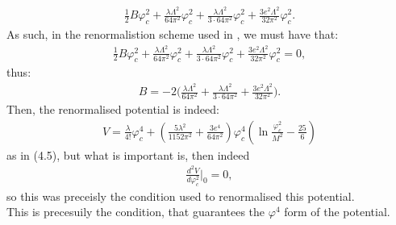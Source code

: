 \begin{align}
\frac{1}{2}B\varphi_c^2 + 
\frac{\lambda\Lambda^2}{64\pi^2}\varphi_c^2+ 
\frac{\lambda\Lambda^2}{3\cdot 64\pi^2}\varphi_c^2+
\frac{3e^2\Lambda^2}{32\pi^2}\varphi_c^2. 
\end{align}
As such, in the renormalistion scheme used in \cite{Coleman1973}, we must have that:
\begin{align}
\frac{1}{2}B\varphi_c^2 + 
\frac{\lambda\Lambda^2}{64\pi^2}\varphi_c^2+ 
\frac{\lambda\Lambda^2}{3\cdot 64\pi^2}\varphi_c^2+
\frac{3e^2\Lambda^2}{32\pi^2}\varphi_c^2 = 0, 
\end{align}
thus:
\begin{align}\label{CW_B_dm}
B = -2\Big(
\frac{\lambda\Lambda^2}{64\pi^2}+ 
\frac{\lambda\Lambda^2}{3\cdot 64\pi^2}+
\frac{3e^2\Lambda^2}{32\pi^2}\Big). 
\end{align}
Then, the renormalised potential is indeed:
\begin{align}
V = \frac{\lambda}{4!}\varphi_c^4+
\left(\frac{5\lambda^2}{1152\pi^2}+\frac{3e^4}{64\pi^2}\right)\varphi_c^4
\left(\ln\frac{\varphi_c^2}{M^2}-\frac{25}{6}\right)
\end{align}
as in \cite{Coleman1973}(4.5), but what is important is, then indeed
\begin{align}
\frac{d^2V}{d\varphi_c^2}\Big|_0=0,
\end{align}
so this was preceisly the condition used to renormalised this potential. \\
This is precesuily the condition, that guarantees the $\varphi^4$ form of the potential.
\label{CWe4potential}












